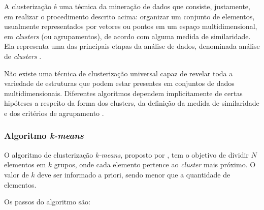 A clusterização é uma técnica da mineração de dados que consiste, justamente, em realizar o procedimento descrito acima: organizar um conjunto de elementos, usualmente representados por vetores ou pontos em um espaço multidimensional, em \textit{clusters} (ou agrupamentos), de acordo com alguma medida de similaridade. Ela representa uma das principais etapas da análise de dados, denominada análise de \textit{clusters} \cite{jain1999}.

Não existe uma técnica de clusterização universal capaz de revelar toda a variedade de estruturas que podem estar presentes em conjuntos de dados multidimensionais. Diferentes algoritmos dependem implicitamente de certas hipóteses a respeito da forma dos clusters, da definição da medida de similaridade e dos critérios de agrupamento \cite{estivill2002}.

\subsubsection{Algoritmo \textit{k-means}}
\label{sub:k_means}

O algoritmo de clusterização \textit{k-means}, proposto por , tem o objetivo de dividir \(N\) elementos em \(k\) grupos, onde cada elemento pertence ao \textit{cluster} mais próximo. O valor de \(k\) deve ser informado a priori, sendo menor que a quantidade de elementos.

Os passos do algoritmo são:

